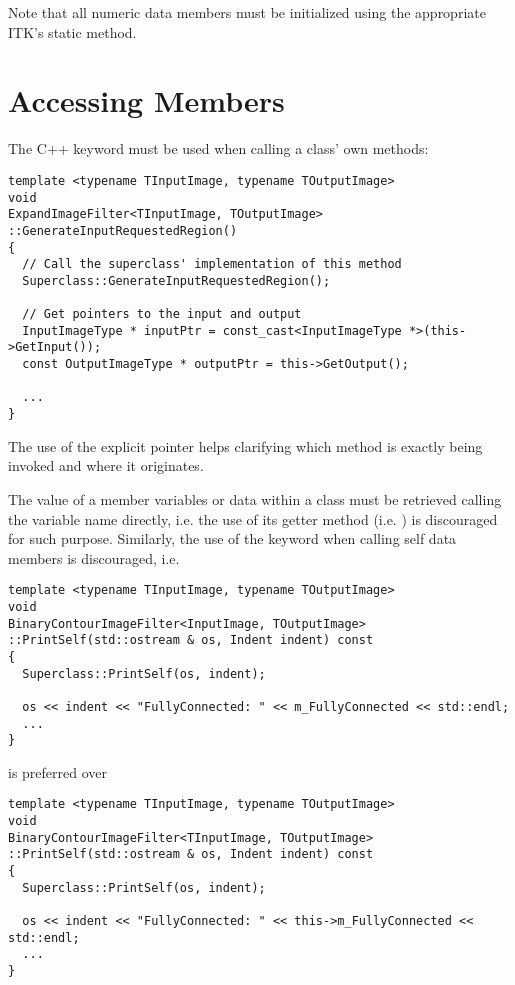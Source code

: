 Note that all numeric data members must be initialized using the appropriate
ITK's  static method.


\section{Accessing Members}
\label{sec:Accessing Members}

The C++ keyword  must be used when calling a class' own methods:

\small
\begin{verbatim}
template <typename TInputImage, typename TOutputImage>
void
ExpandImageFilter<TInputImage, TOutputImage>
::GenerateInputRequestedRegion()
{
  // Call the superclass' implementation of this method
  Superclass::GenerateInputRequestedRegion();

  // Get pointers to the input and output
  InputImageType * inputPtr = const_cast<InputImageType *>(this->GetInput());
  const OutputImageType * outputPtr = this->GetOutput();

  ...
}
\end{verbatim}
\normalsize

The use of the explicit  pointer helps clarifying which method is
exactly being invoked and where it originates.

The value of a member variables or data within a class must be retrieved calling
the variable name directly, i.e. the use of its getter method (i.e.
) is discouraged for such purpose. Similarly, the use of the
 keyword when calling self data members is discouraged, i.e.

\small
\begin{verbatim}
template <typename TInputImage, typename TOutputImage>
void
BinaryContourImageFilter<InputImage, TOutputImage>
::PrintSelf(std::ostream & os, Indent indent) const
{
  Superclass::PrintSelf(os, indent);

  os << indent << "FullyConnected: " << m_FullyConnected << std::endl;
  ...
}
\end{verbatim}
\normalsize

is preferred over

\small
\begin{verbatim}
template <typename TInputImage, typename TOutputImage>
void
BinaryContourImageFilter<TInputImage, TOutputImage>
::PrintSelf(std::ostream & os, Indent indent) const
{
  Superclass::PrintSelf(os, indent);

  os << indent << "FullyConnected: " << this->m_FullyConnected << std::endl;
  ...
}
\end{verbatim}
\normalsize



